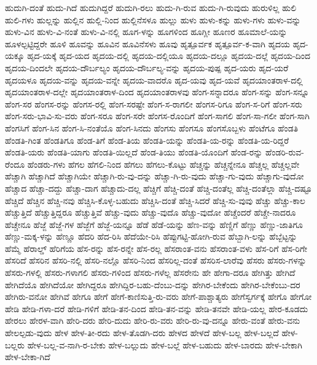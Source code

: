 {ಹುದುಗಿ-ದಂತೆ
ಹುದು-ಗಿದೆ
ಹುದುಗಿದ್ದರೆ
ಹುದುಗಿ-ರಲು
ಹುದು-ಗಿ-ರುವ
ಹುದು-ಗಿ-ರುವುದು
ಹುರುಳಿಲ್ಲ
ಹುಲಿ
ಹುಲಿ-ಗಳು
ಹುಲ್ಲನ್ನು
ಹುಲ್ಲಿನ
ಹುಲ್ಲಿ-ನಿಂದ
ಹುಲ್ಲಿನೆಸಳೂ
ಹುಲ್ಲು
ಹುಳು
ಹುಳು-ಕನ್ನು
ಹುಳು-ಗಳು
ಹುಳು-ವನ್ನು
ಹುಳು-ವಿನ
ಹುಳು-ವಿ-ನಂತೆ
ಹುಳು-ವಿ-ನಲ್ಲಿ
ಹೂಗ-ಳನ್ನು
ಹೂಗಳಿಂದ
ಹೂಗ್ಲೀ
ಹೂಣರ
ಹೂಮಾಲೆ-ಯನ್ನು
ಹೂಳಲ್ಪಟ್ಟಿದ್ದರೇ
ಹೂಳಿ
ಹೂವನ್ನು
ಹೂವಿನ
ಹೂವಿನೆಸಳು
ಹೂವು
ಹೃತ್ಪೂರ್ವಕ
ಹೃತ್ಪೂರ್ವ-ಕ-ವಾಗಿ
ಹೃದಯ
ಹೃದ-ಯಕ್ಕೂ
ಹೃದ-ಯಕ್ಕೆ
ಹೃದ-ಯದ
ಹೃದಯ-ದಲ್ಲಿ
ಹೃದಯ-ದಲ್ಲಿಯೂ
ಹೃದಯ-ದಲ್ಲೂ
ಹೃದಯ-ದಲ್ಲೆ
ಹೃದಯ-ದಿಂದ
ಹೃದಯ-ದಿಂದಲೇ
ಹೃದಯ-ದೌರ್ಬಲ್ಯಂ
ಹೃದಯ-ದೌರ್ಬಲ್ಯ-ವನ್ನು
ಹೃದಯ-ಪುಷ್ಪ
ಹೃದ-ಯರು
ಹೃದ-ಯರೆ
ಹೃದಯಳೂ
ಹೃದಯ-ವನ್ನು
ಹೃದಯ-ವನ್ನೇ
ಹೃದಯ-ವಾದರೊ
ಹೃದ-ಯವು
ಹೃದ-ಯವೆ
ಹೃದಯಾಂತರಾಳ-ದಲ್ಲಿ
ಹೃದಯಾಂತರಾಳ-ದಲ್ಲೇ
ಹೃದಯಾಂತರಾಳ-ದಿಂದ
ಹೃದಯಾಂತರಾಳವು
ಹೆಂಗ-ಸನ್ನಾದರೂ
ಹೆಂಗ-ಸನ್ನು
ಹೆಂಗ-ಸನ್ನೂ
ಹೆಂಗ-ಸರ
ಹೆಂಗಸ-ರನ್ನು
ಹೆಂಗಸ-ರಲ್ಲಿ
ಹೆಂಗ-ಸರಷ್ಟೇ
ಹೆಂಗ-ಸ-ರಾಗಲೀ
ಹೆಂಗಸ-ರಿಗೂ
ಹೆಂಗ-ಸ-ರಿಗೆ
ಹೆಂಗ-ಸರು
ಹೆಂಗ-ಸರು-ಭಾವಿ-ಸು-ವರು
ಹೆಂಗ-ಸರೂ
ಹೆಂಗ-ಸರೇ
ಹೆಂಗಸ-ರೊಂದಿಗೆ
ಹೆಂಗ-ಸಾಗಲಿ
ಹೆಂಗ-ಸಾ-ಗಲೀ
ಹೆಂಗ-ಸಾಗಿ
ಹೆಂಗಸಿಗೆ
ಹೆಂಗ-ಸಿನ
ಹೆಂಗ-ಸಿ-ನಂತೆಯೊ
ಹೆಂಗ-ಸಿನದು
ಹೆಂಗಸು
ಹೆಂಗಸೂ
ಹೆಂಗಸೊಬ್ಬಳು
ಹೆಂಟೆಗೂ
ಹೆಂಡತಿ
ಹೆಂಡತಿ-ಗಿಂತ
ಹೆಂಡತಿಗೂ
ಹೆಂಡ-ತಿಗೆ
ಹೆಂಡ-ತಿಯ
ಹೆಂಡತಿ-ಯನ್ನು
ಹೆಂಡತಿ-ಯ-ರನ್ನು
ಹೆಂಡತಿ-ಯ-ರಿದ್ದರೆ
ಹೆಂಡತಿ-ಯರು
ಹೆಂಡತಿ-ಯಾಗು
ಹೆಂಡತಿ-ಯಿಲ್ಲದೆ
ಹೆಂಡ-ತಿಯು
ಹೆಂಡತಿ-ಯೊಂದಿಗೆ
ಹೆಂಡ-ರನ್ನು
ಹೆಂಡರಿ-ರುವ-ರೆಂದೂ
ಹೆಂಡರು-ಗಳು
ಹೆಗಲ
ಹೆಗಲಿ-ನಿಂದ
ಹೆಗಲು
ಹೆಗಲು-ಕೊಟ್ಟು
ಹೆಚ್ಚನ್ನು
ಹೆಚ್ಚನ್ನೇನೂ
ಹೆಚ್ಚಲ್ಲ
ಹೆಚ್ಚಲ್ಲವೇ
ಹೆಚ್ಚಾಗಿ
ಹೆಚ್ಚಾಗಿದೆ
ಹೆಚ್ಚಾಗಿಯೇ
ಹೆಚ್ಚಾಗಿ-ರು-ವು-ದನ್ನು
ಹೆಚ್ಚಾ-ಗಿ-ರು-ವುದು
ಹೆಚ್ಚಾ-ಗು-ವುದು
ಹೆಚ್ಚಾಗು-ವುದೋ
ಹೆಚ್ಚಾದ
ಹೆಚ್ಚಾ-ದದ್ದು
ಹೆಚ್ಚಾ-ದಾಗ
ಹೆಚ್ಚಾದು-ದಲ್ಲ
ಹೆಚ್ಚಿಗೆ
ಹೆಚ್ಚಿ-ದಂತೆ
ಹೆಚ್ಚಿ-ದಂತೆಲ್ಲ
ಹೆಚ್ಚಿ-ದಂತೆಲ್ಲಾ
ಹೆಚ್ಚಿ-ದಷ್ಟೂ
ಹೆಚ್ಚಿದೆ
ಹೆಚ್ಚಿನ
ಹೆಚ್ಚಿ-ನವು
ಹೆಚ್ಚಿಸಿ-ಕೊಳ್ಳ-ಬಹುದು
ಹೆಚ್ಚಿಸಿ-ದಂತೆ
ಹೆಚ್ಚಿ-ಸಿದರೆ
ಹೆಚ್ಚಿ-ಸು-ವುವು
ಹೆಚ್ಚು
ಹೆಚ್ಚು-ಕಾಲ
ಹೆಚ್ಚುತ್ತಿದೆ
ಹೆಚ್ಚುತ್ತಿದ್ದರೂ
ಹೆಚ್ಚುತ್ತಿವೆ
ಹೆಚ್ಚು-ವುದು
ಹೆಚ್ಚು-ವುದೊ
ಹೆಚ್ಚು-ವುದೋ
ಹೆಚ್ಚೆಂದರೆ
ಹೆಚ್ಚೇ-ನಾದರೂ
ಹೆಚ್ಚೇನೂ
ಹೆಜ್ಜೆ
ಹೆಜ್ಜೆ-ಗಳ
ಹೆಜ್ಜೆಗೆ
ಹೆಜ್ಜೆ-ಯನ್ನೂ
ಹೆಡೆ
ಹೆಡೆ-ಯನ್ನು
ಹೆಣ-ವನ್ನು
ಹೆಣ್ಣಿಗೆ
ಹೆಣ್ಣು
ಹೆಣ್ಣು-ಜಾತಿಗೂ
ಹೆಣ್ಣು-ಮಕ್ಕ-ಳನ್ನು
ಹೆಣ್ಣೂ
ಹೆದರಿ
ಹೆದ-ರಿಸಿ
ಹೆದೆಯೇ-ರಿಸಿ
ಹೆಪ್ಪುಗಟ್ಟಿ-ಹೋಗಿ-ರುವ
ಹೆಬ್ಬಾಗಿ-ಲನ್ನು
ಹೆಬ್ಬೆಟ್ಟನ್ನು
ಹೆಮ್ಮೆ
ಹೆರಾಲ್ಡ್
ಹೆರಿಗೆಯ
ಹೆಸ-ರನ್ನು
ಹೆಸ-ರನ್ನೇ
ಹೆಸ-ರಲ್ಲ
ಹೆಸರಾಂತ-ವನು
ಹೆಸರಾಂತ-ವಳು
ಹೆಸ-ರಿಗೆ
ಹೆಸ-ರಿಗೇ
ಹೆಸರಿದೆ
ಹೆಸರಿನ
ಹೆಸರಿ-ನಲ್ಲಿ
ಹೆಸರಿ-ನಲ್ಲೊ
ಹೆಸರಿ-ನಿಂದ
ಹೆಸರಿಲ್ಲ-ದಂತೆ
ಹೆಸರಿಸ-ಲಾರೆವು
ಹೆಸರು
ಹೆಸರು-ಗಳನ್ನು
ಹೆಸರು-ಗಳಲ್ಲಿ
ಹೆಸರು-ಗಳಾಗಲಿ
ಹೆಸರು-ಗಳಿಂದ
ಹೆಸರು-ಗಳೆಲ್ಲ
ಹೆಸರೇನು
ಹೇ
ಹೇಗಾ-ದರೂ
ಹೇಗಿತ್ತು
ಹೇಗಿದೆ
ಹೇಗಿದೆಯೊ
ಹೇಗಿದೆಯೋ
ಹೇಗಿದ್ದರೂ
ಹೇಗಿದ್ದಿರ-ಬಹು-ದೆಂಬು-ದನ್ನು
ಹೇಗಿರ-ಬೇಕೆಂದು
ಹೇಗಿರ-ಬೇಕೆಂಬು-ದರ
ಹೇಗಿರು-ವನೋ
ಹೇಗಿವೆ
ಹೇಗೂ
ಹೇಗೆ
ಹೇಗೆ-ಕಾಣಿಸುತ್ತಿ-ರು-ವರು
ಹೇಗೆ-ಪಾಶ್ಚಾತ್ಯರು
ಹೇಗೆಸ್ವರ್ಗಕ್ಕೆ
ಹೇಗೊ
ಹೇಗೋ
ಹೇಡಿ
ಹೇಡಿ-ಗಳಾ-ದರೆ
ಹೇಡಿ-ಗಳಿಗೆ
ಹೇಡಿ-ತನ-ದಿಂದ
ಹೇಡಿ-ತನ-ವನ್ನು
ಹೇಡಿ-ತನವೇ
ಹೇಡಿ-ಯಲ್ಲ
ಹೇರ-ಕೂಡದು
ಹೇರಲು
ಹೇರಳ-ವಾಗಿ
ಹೇರಿ-ದರು
ಹೇರಿ-ದುದು
ಹೇರಿ-ರು-ವರು
ಹೇರಿ-ರು-ವು-ದನ್ನೂ
ಹೇರು-ವಂತೆ
ಹೇರು-ವನು
ಹೇಲಲ್ಪಡು-ವುದು
ಹೇಳ
ಹೇಳ-ತೀ-ರದು
ಹೇಳ-ತೊಡಗಿ-ದರು
ಹೇಳದ
ಹೇಳದೆ
ಹೇಳ-ಬಲ್ಲ
ಹೇಳ-ಬಲ್ಲದೆ
ಹೇಳ-ಬಲ್ಲರು
ಹೇಳ-ಬಲ್ಲ-ವ-ನಾಗಿ-ರ-ಬೇಕು
ಹೇಳ-ಬಲ್ಲುದು
ಹೇಳ-ಬಲ್ಲೆ
ಹೇಳ-ಬಹುದು
ಹೇಳ-ಬಾರದು
ಹೇಳ-ಬೇಕಾಗಿ
ಹೇಳ-ಬೇಕಾ-ಗಿದೆ
}
